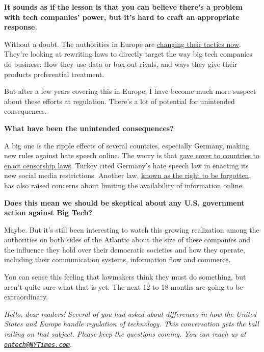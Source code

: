 \textbf{It sounds as if the lesson is that you can believe there's a
problem with tech companies' power, but it's hard to craft an
appropriate response.}

Without a doubt. The authorities in Europe are
\href{https://www.nytimes3xbfgragh.onion/2020/07/30/technology/europe-new-phase-tech-amazon-apple-facebook-google.html}{changing
their tactics now}. They're looking at rewriting laws to directly target
the way big tech companies do business: How they use data or box out
rivals, and ways they give their products preferential treatment.

But after a few years covering this in Europe, I have become much more
suspect about these efforts at regulation. There's a lot of potential
for unintended consequences.

\textbf{What have been the unintended consequences?}

A big one is the ripple effects of several countries, especially
Germany, making new rules against hate speech online. The worry is that
\href{https://www.nytimes3xbfgragh.onion/2019/05/06/technology/europe-tech-censorship.html}{gave
cover to countries to enact censorship laws}. Turkey cited Germany's
hate speech law in enacting its new social media restrictions. Another
law,
\href{https://www.nytimes3xbfgragh.onion/2019/09/23/technology/right-to-be-forgotten-law-europe.html}{known
as the right to be forgotten}, has also raised concerns about limiting
the availability of information online.

\textbf{Does this mean we should be skeptical about any U.S. government
action against Big Tech?}

Maybe. But it's still been interesting to watch this growing realization
among the authorities on both sides of the Atlantic about the size of
these companies and the influence they hold over their democratic
societies and how they operate, including their communication systems,
information flow and commerce.

You can sense this feeling that lawmakers think they must do something,
but aren't quite sure what that is yet. The next 12 to 18 months are
going to be extraordinary.

\emph{Hello, dear readers! Several of you had asked about differences in
how the United States and Europe handle regulation of technology. This
conversation gets the ball rolling on that subject. Please keep the
questions coming. You can reach us at
\href{mailto:ontech@NYTimes.com}{\nolinkurl{ontech@NYTimes.com}}.}

